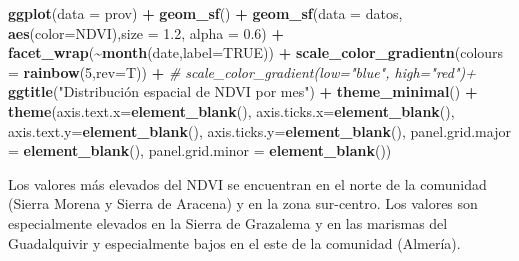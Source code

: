 \documentclass[12pt,a4paper,]{book}
\newenvironment{Shaded}{\begin{snugshade}}{\end{snugshade}}
\newcommand{\AttributeTok}[1]{\textcolor[rgb]{0.13,0.29,0.53}{#1}}
\newcommand{\CommentTok}[1]{\textcolor[rgb]{0.56,0.35,0.01}{\textit{#1}}}
\newcommand{\ConstantTok}[1]{\textcolor[rgb]{0.56,0.35,0.01}{#1}}
\newcommand{\DecValTok}[1]{\textcolor[rgb]{0.00,0.00,0.81}{#1}}
\newcommand{\FloatTok}[1]{\textcolor[rgb]{0.00,0.00,0.81}{#1}}
\newcommand{\FunctionTok}[1]{\textcolor[rgb]{0.13,0.29,0.53}{\textbf{#1}}}
\newcommand{\NormalTok}[1]{#1}
\newcommand{\SpecialCharTok}[1]{\textcolor[rgb]{0.81,0.36,0.00}{\textbf{#1}}}
\newcommand{\StringTok}[1]{\textcolor[rgb]{0.31,0.60,0.02}{#1}}
\numberwithin{dummy}{section}
\theoremstyle{ocrenumbox}
\theoremstyle{blacknumex}
\theoremstyle{blacknumbox}
\theoremstyle{ocrenum}
\theoremstyle{ocrenum}
\begin{document}
\begin{Shaded}
\begin{Highlighting}[]
\FunctionTok{ggplot}\NormalTok{(}\AttributeTok{data =}\NormalTok{ prov) }\SpecialCharTok{+} 
  \FunctionTok{geom\_sf}\NormalTok{() }\SpecialCharTok{+}
  \FunctionTok{geom\_sf}\NormalTok{(}\AttributeTok{data =}\NormalTok{ datos, }\FunctionTok{aes}\NormalTok{(}\AttributeTok{color=}\NormalTok{NDVI),}\AttributeTok{size =} \FloatTok{1.2}\NormalTok{, }\AttributeTok{alpha =} \FloatTok{0.6}\NormalTok{) }\SpecialCharTok{+}
  \FunctionTok{facet\_wrap}\NormalTok{(}\SpecialCharTok{\textasciitilde{}}\FunctionTok{month}\NormalTok{(date,}\AttributeTok{label=}\ConstantTok{TRUE}\NormalTok{)) }\SpecialCharTok{+} 
  \FunctionTok{scale\_color\_gradientn}\NormalTok{(}\AttributeTok{colours =} \FunctionTok{rainbow}\NormalTok{(}\DecValTok{5}\NormalTok{,}\AttributeTok{rev=}\NormalTok{T)) }\SpecialCharTok{+}
  \CommentTok{\# scale\_color\_gradient(low="blue", high="red")+}
  \FunctionTok{ggtitle}\NormalTok{(}\StringTok{"Distribución espacial de NDVI por mes"}\NormalTok{) }\SpecialCharTok{+}
  \FunctionTok{theme\_minimal}\NormalTok{() }\SpecialCharTok{+}
  \FunctionTok{theme}\NormalTok{(}\AttributeTok{axis.text.x=}\FunctionTok{element\_blank}\NormalTok{(),}
        \AttributeTok{axis.ticks.x=}\FunctionTok{element\_blank}\NormalTok{(),}
        \AttributeTok{axis.text.y=}\FunctionTok{element\_blank}\NormalTok{(),}
        \AttributeTok{axis.ticks.y=}\FunctionTok{element\_blank}\NormalTok{(),}
        \AttributeTok{panel.grid.major =} \FunctionTok{element\_blank}\NormalTok{(),}
        \AttributeTok{panel.grid.minor =} \FunctionTok{element\_blank}\NormalTok{())}
\end{Highlighting}
\end{Shaded}

Los valores más elevados del NDVI se encuentran en el norte de la
comunidad (Sierra Morena y Sierra de Aracena) y en la zona sur-centro.
Los valores son especialmente elevados en la Sierra de Grazalema y en
las marismas del Guadalquivir y especialmente bajos en el este de la
comunidad (Almería).
\end{document}
